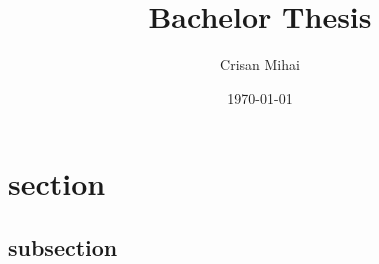 \documentclass{article}
\title{Bachelor Thesis}
\date{\today}
\author{Crisan Mihai}
\begin{document}

\maketitle
\newpage

\doublespacing
\tableofcontents
\singlespacing
\newpage



\newpage

\section{section}
\subsection{subsection}
	
\begin{appendix}
	\doublespacing
	\listoffigures
	\newpage
	\listoftables
	\newpage
	\singlespacing
\end{appendix}
\end{document}
